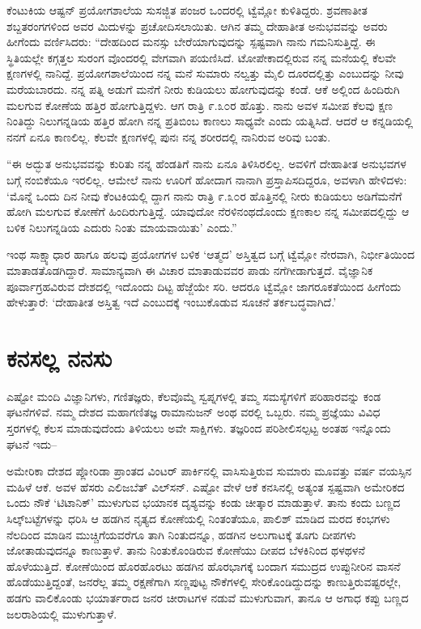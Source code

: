 ಕೆಂಟುಕಿಯ ಆಷ್ಟನ್ ಪ್ರಯೋಗಶಾಲೆಯ ಸುಸಜ್ಜಿತ ಪಂಜರ ಒಂದರಲ್ಲಿ ಟ್ವೆಮ್ಲೋ ಕುಳಿತಿದ್ದರು. ಶ್ರವಣಾತೀತ ಶಬ್ದತರಂಗಗಳಿಂದ ಅವರ ಮಿದುಳನ್ನು ಪ್ರಚೋದಿಸಲಾಯಿತು. ಆಗಿನ ತಮ್ಮ ದೇಹಾತೀತ ಅನುಭವವನ್ನು ಅವರು ಹೀಗೆಂದು ವರ್ಣಿಸಿದರು: “ದೇಹದಿಂದ ಮನಸ್ಸು ಬೇರೆಯಾಗುವುದನ್ನು ಸ್ಪಷ್ಟವಾಗಿ ನಾನು ಗಮನಿಸುತ್ತಿದ್ದೆ. ಈ ಸ್ಥಿತಿಯಲ್ಲೇ ಕಗ್ಗತ್ತಲ ಸುರಂಗ ವೊಂದರಲ್ಲಿ ವೇಗವಾಗಿ ಪಯಣಿಸಿದೆ. ಟೋಪೇಕಾದಲ್ಲಿರುವ ನನ್ನ ಮನೆಯಲ್ಲಿ ಕೆಲವೇ ಕ್ಷಣಗಳಲ್ಲಿ ನಾನಿದ್ದೆ. ಪ್ರಯೋಗಶಾಲೆಯಿಂದ ನನ್ನ ಮನೆ ಸುಮಾರು ನಲ್ವತ್ತು ಮೈಲಿ ದೂರದಲ್ಲಿತ್ತು ಎಂಬುದನ್ನು ನೀವು ಮರೆಯಬಾರದು. ನನ್ನ ಪತ್ನಿ ಅಡುಗೆ ಮನೆಗೆ ನೀರು ಕುಡಿಯಲು ಹೋಗುವುದನ್ನು ಕಂಡೆ. ಆಕೆ ಅಲ್ಲಿಂದ ಹಿಂದಿರುಗಿ ಮಲಗುವ ಕೋಣೆಯ ಹತ್ತಿರ ಹೋಗುತ್ತಿದ್ದಳು. ಆಗ ರಾತ್ರಿ ೯.೩೦ರ ಹೊತ್ತು. ನಾನು ಅವಳ ಸಮೀಪ ಕೆಲವು ಕ್ಷಣ ನಿಂತಿದ್ದು ನಿಲುಗನ್ನಡಿಯ ಹತ್ತಿರ ಹೋಗಿ ನನ್ನ ಪ್ರತಿಬಿಂಬ ಕಾಣಲು ಸಾಧ್ಯವೇ ಎಂದು ಯತ್ನಿಸಿದೆ. ಆದರೆ ಆ ಕನ್ನಡಿಯಲ್ಲಿ ನನಗೆ ಏನೂ ಕಾಣಲಿಲ್ಲ. ಕೆಲವೇ ಕ್ಷಣಗಳಲ್ಲಿ ಪುನಃ ನನ್ನ ಶರೀರದಲ್ಲಿ ನಾನಿರುವ ಅರಿವು ಬಂತು.

“ಈ ಅದ್ಭುತ ಅನುಭವವನ್ನು ಕುರಿತು ನನ್ನ ಹೆಂಡತಿಗೆ ನಾನು ಏನೂ ತಿಳಿಸಿರಲಿಲ್ಲ. ಅವಳಿಗೆ ದೇಹಾತೀತ ಅನುಭವಗಳ ಬಗ್ಗೆ ನಂಬಿಕೆಯೂ ಇರಲಿಲ್ಲ. ಆಮೇಲೆ ನಾನು ಊರಿಗೆ ಹೋದಾಗ ನಾನಾಗಿ ಪ್ರಸ್ತಾಪಿಸದಿದ್ದರೂ, ಅವಳಾಗಿ ಹೇಳಿದಳು: ‘ಮೊನ್ನೆ ಒಂದು ದಿನ ನೀವು ಕೆಂಟಕಿಯಲ್ಲಿ ದ್ದಾಗ ನಾನು ರಾತ್ರಿ ೯.೩೦ರ ಹೊತ್ತಿನಲ್ಲಿ ನೀರು ಕುಡಿಯಲು ಅಡಿಗೆಮನೆಗೆ ಹೋಗಿ ಮಲಗುವ ಕೋಣೆಗೆ ಹಿಂದಿರುಗುತ್ತಿದ್ದೆ. ಯಾವುದೋ ನೆರಳಿನಂಥದೊಂದು ಕ್ಷಣಕಾಲ ನನ್ನ ಸಮೀಪದಲ್ಲಿದ್ದು ಆ ಬಳಿಕ ನಿಲುಗನ್ನಡಿಯ ಎದುರು ನಿಂತು ಮಾಯವಾಯಿತು’ ಎಂದು.”

ಇಂಥ ಸಾಕ್ಷ್ಯಾಧಾರ ಹಾಗೂ ಹಲವು ಪ್ರಯೋಗಗಳ ಬಳಿಕ ‘ಆತ್ಮದ’ ಅಸ್ತಿತ್ವದ ಬಗ್ಗೆ ಟ್ವೆಮ್ಲೋ ನೇರವಾಗಿ, ನಿರ್ಭೀತಿಯಿಂದ ಮಾತಾಡತೊಡಗಿದ್ದಾರೆ. ಸಾಮಾನ್ಯವಾಗಿ ಈ ವಿಚಾರ ಮಾತಾಡುವವರ ಪಾಡು ನಗೆಗೀಡಾಗುತ್ತದೆ. ವೈಜ್ಞಾನಿಕ ಪೂರ್ವಾಗ್ರಹವಿರುವ ದೇಶದಲ್ಲಿ ಇದೊಂದು ದಿಟ್ಟ ಹೆಜ್ಜೆಯೇ ಸರಿ. ಆದರೂ ಟ್ವೆಮ್ಲೋ ಜಾಗರೂಕತೆಯಿಂದ ಹೀಗೆಂದು ಹೇಳುತ್ತಾರೆ: ‘ದೇಹಾತೀತ ಅಸ್ತಿತ್ವ ಇದೆ ಎಂಬುದಕ್ಕೆ ಇಂಬುಕೊಡುವ ಸೂಚನೆ ತರ್ಕಬದ್ಧವಾಗಿದೆ.’


\section{ಕನಸಲ್ಲ ನನಸು}

ಎಷ್ಟೋ ಮಂದಿ ವಿಜ್ಞಾನಿಗಳು, ಗಣಿತಜ್ಞರು, ಕೆಲವೊಮ್ಮೆ ಸ್ವಪ್ನಗಳಲ್ಲಿ ತಮ್ಮ ಸಮಸ್ಯೆಗಳಿಗೆ ಪರಿಹಾರವನ್ನು ಕಂಡ ಘಟನೆಗಳಿವೆ. ನಮ್ಮ ದೇಶದ ಮಹಾಗಣಿತಜ್ಞ ರಾಮಾನುಜನ್ ಅಂಥ ವರಲ್ಲಿ ಒಬ್ಬರು. ನಮ್ಮ ಪ್ರಜ್ಞೆಯು ವಿವಿಧ ಸ್ತರಗಳಲ್ಲಿ ಕೆಲಸ ಮಾಡುವುದೆಂದು ತಿಳಿಯಲು ಅವೇ ಸಾಕ್ಷಿಗಳು. ತಜ್ಞರಿಂದ ಪರಿಶೀಲಿಸಲ್ಪಟ್ಟ ಅಂತಹ ಇನ್ನೊಂದು ಘಟನೆ ಇದು–

ಅಮೇರಿಕಾ ದೇಶದ ಪ್ಲೋರಿಡಾ ಪ್ರಾಂತದ ವಿಂಟರ್ ಪಾರ್ಕಿನಲ್ಲಿ ವಾಸಿಸುತ್ತಿರುವ ಸುಮಾರು ಮೂವತ್ತು ವರ್ಷ ವಯಸ್ಸಿನ ಮಹಿಳೆ ಆಕೆ. ಅವಳ ಹೆಸರು ಎಲಿಜಬೆತ್ ವಿಲ್​ಸನ್. ಎಷ್ಟೋ ವೇಳೆ ಆಕೆ ಕನಸಿನಲ್ಲಿ ಅತ್ಯಂತ ಸ್ಪಷ್ಟವಾಗಿ ಅಮೇರಿಕದ ಒಂದು ನೌಕೆ ‘ಟಿಟಾನಿಕ್​’ ಮುಳುಗುವ ಭಯಾನಕ ದೃಶ್ಯವನ್ನು ಕಂಡು ಚೀತ್ಕಾರ ಮಾಡುತ್ತಾಳೆ. ತಾನು ಕಂದು ಬಣ್ಣದ ಸಿಲ್ಕ್​ಬಟ್ಟೆಗಳನ್ನು ಧರಿಸಿ ಆ ಹಡಗಿನ ನೃತ್ಯದ ಕೋಣೆಯಲ್ಲಿ ನಿಂತಂತೆಯೂ, ಪಾಲಿಶ್ ಮಾಡಿದ ಮರದ ಕಂಭಗಳು ನೆಲದಿಂದ ಮಾಡಿನ ಮುಚ್ಚಿಗೆಯವರೆಗೂ ತಾಗಿ ನಿಂತುದನ್ನೂ, ಹಡಗಿನ ಅಲುಗಾಟಕ್ಕೆ ತೂಗು ದೀಪಗಳು ಜೋತಾಡುವುದನ್ನೂ ಕಾಣುತ್ತಾಳೆ. ತಾನು ನಿಂತುಕೊಂಡಿರುವ ಕೋಣೆಯು ದೀಪದ ಬೆಳಕಿನಿಂದ ಥಳಥಳನೆ ಹೊಳೆಯುತ್ತಿದೆ. ಕೋಣೆಯಿಂದ ಹೊರಹೊರಟು ಹಡಗಿನ ಹೊರಭಾಗಕ್ಕೆ ಬಂದಾಗ ಸಮುದ್ರದ ಉಪ್ಪುನೀರಿನ ವಾಸನೆ ಹೊಡೆಯುತ್ತಿದ್ದಂತೆ, ಜನರೆಲ್ಲ ತಮ್ಮ ರಕ್ಷಣೆಗಾಗಿ ಸಣ್ಣಪುಟ್ಟ ನೌಕೆಗಳಲ್ಲಿ ಸೇರಿಕೊಂಡಿದ್ದುದನ್ನು ಕಾಣುತ್ತಿರುವಷ್ಟರಲ್ಲೇ, ಹಡಗು ವಾಲಿಕೊಂಡು ಭಯಾರ್ತರಾದ ಜನರ ಚೀರಾಟಗಳ ನಡುವೆ ಮುಳುಗುವಾಗ, ತಾನೂ ಆ ಅಗಾಧ ಕಪ್ಪು ಬಣ್ಣದ ಜಲರಾಶಿಯಲ್ಲಿ ಮುಳುಗುತ್ತಾಳೆ.

